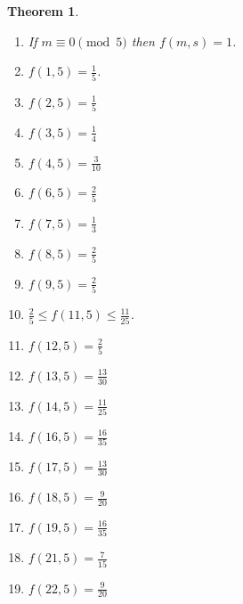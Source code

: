 \documentclass[12pt]{article}
\newtheorem{theoremfoo}{Theorem}[section] %
\newenvironment{theorem}{\pagebreak[1]\begin{theoremfoo}}{\end{theoremfoo}}
\begin{document}
\begin{theorem}~
\begin{enumerate}
\item
If $m\equiv 0 \pmod 5$ then $f(m,s)=1$.
\item
$f(1,5)=\frac{1}{5}$.
\item
$f(2,5)=\frac{1}{5}$
\item
$f(3,5)=\frac{1}{4}$
\item
$f(4,5)=\frac{3}{10}$
\item
$f(6,5)=\frac{2}{5}$
\item
$f(7,5)=\frac{1}{3}$
\item
$f(8,5)=\frac{2}{5}$
\item
$f(9,5)=\frac{2}{5}$
\item
$\frac{2}{5} \le f(11,5)\le \frac{11}{25}$.
\item
$f(12,5)=\frac{2}{5}$
\item
$f(13,5)=\frac{13}{30}$
\item
$f(14,5)=\frac{11}{25}$
\item
$f(16,5)=\frac{16}{35}$
\item
$f(17,5)=\frac{13}{30}$
\item
$f(18,5)=\frac{9}{20}$
\item
$f(19,5)=\frac{16}{35}$
\item
$f(21,5)=\frac{7}{15}$
\item
$f(22,5)=\frac{9}{20}$
\end{enumerate}
\end{theorem}
\end{document}

